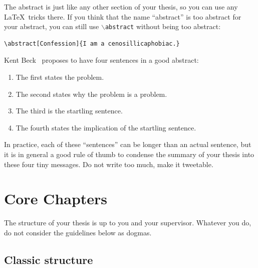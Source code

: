 \documentclass{uvamscse}
\newcommand{\cmd}[1]{\texttt{$\backslash$#1}}
\begin{document}
The abstract is just like any other section of your thesis, so you can use any
\LaTeX\ tricks there. If you think that the name ``abstract'' is too abstract
for your abstract, you can still use \cmd{abstract} without being too
abstract:

\begin{snippet}
\begin{verbatim}
\abstract[Confession]{I am a cenosillicaphobiac.}
\end{verbatim}
\end{snippet}

Kent Beck~\cite{JohnsonBBCGW93} proposes to have four sentences in a good abstract:

\begin{enumerate}
  \item The first states the problem.
  \item The second states why the problem is a problem.
  \item The third is the startling sentence.
  \item The fourth states the implication of the startling sentence.
\end{enumerate}

In practice, each of these ``sentences'' can be longer than an actual
sentence, but it is in general a good rule of thumb to condense the summary of
your thesis into these four tiny messages. Do not write too much, make it
tweetable.

\chapter{Core Chapters}

The structure of your thesis is up to you and your supervisor. Whatever you
do, do not consider the guidelines below as dogmas.

\section{Classic structure}
\end{document}
